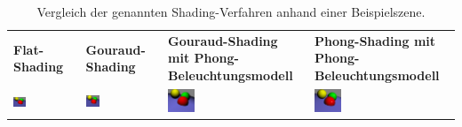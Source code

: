 \begin{table}[H]
    \centering
    \caption{Vergleich der genannten Shading-Verfahren anhand einer
    Beispielszene\protect\footnotemark.}\label{table:shading_comparision}
    \begin{tabular}{p{}p{}p{}p{}}
        \toprule
            \textbf{Flat-Shading} &
            \textbf{Gouraud-Shading} &
            \textbf{Gouraud-Shading mit Phong-Beleuchtungsmodell} &
            \textbf{Phong-Shading mit Phong-Beleuchtungsmodell} \\
            \cmidrule(r){1-1}\cmidrule(lr){2-2}\cmidrule(lr){3-3}\cmidrule(l){4-4}
            \includegraphics[width=0.2\textwidth]{img/flat_shading_example.pdf} \newline &
            \includegraphics[width=0.2\textwidth]{img/gouraud_shading_example.pdf} \newline &
            \includegraphics[width=0.2\textwidth]{img/phong_gouraud_shading_example.pdf} \newline &
            \includegraphics[width=0.2\textwidth]{img/phong_phong_shading_example.pdf} \newline \\
        \bottomrule
    \end{tabular}
\end{table}
